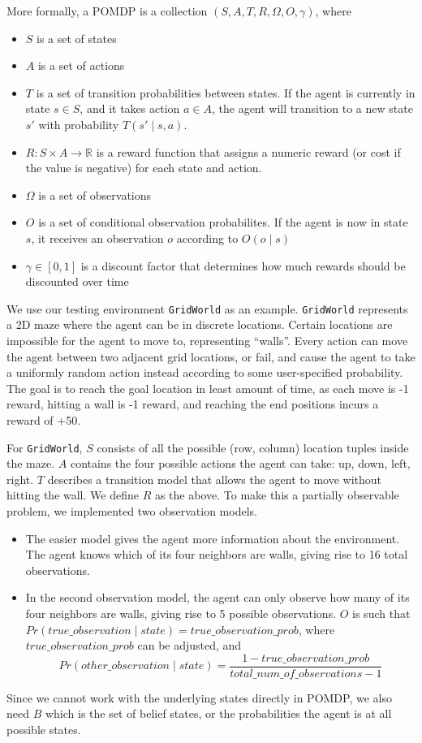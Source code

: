 \documentclass{pset}
\begin{document}
More formally, a POMDP is a collection $(S,A,T,R,\Omega,O,\gamma)$, where

\begin{itemize}
\item $S$ is a set of states
\item $A$ is a set of actions
\item $T$ is a set of transition probabilities between states. If the agent is currently in state $s
\in S$, and it takes action $a \in A$, the agent will transition to a new state
$s'$ with probability
$T(s' \mid s,a)$.
\item $R: S \times A \rightarrow \mathbb{R}$ is a reward function that assigns a numeric reward (or
cost if the value is negative) for each state and action.
\item $\Omega$ is a set of observations
\item $O$ is a set of conditional observation probabilites. If the agent is now in state $s$,
it receives an observation $o$ according to $O(o \mid s)$
\item $\gamma \in [0,1]$ is a discount factor that determines how much rewards should be discounted over time
\end{itemize}

We use our testing environment \texttt{GridWorld} as an example.
\texttt{GridWorld} represents a 2D maze where the agent can be in discrete locations.
Certain locations are impossible for the agent to move to, representing ``walls''. Every
action can move the agent between two adjacent grid locations, or fail, and
cause
the agent to take a uniformly random action instead according to some
user-specified probability. The goal is to reach
the goal location in least amount of time, as each move is -1 reward, hitting a
wall is -1 reward, and reaching the end positions incurs a reward of +50.

For \texttt{GridWorld}, $S$ consists of all the possible (row, column) location
tuples inside the maze.  $A$ contains the four possible actions the agent can
take: up, down, left, right.  $T$ describes a transition model that allows the
agent to move without hitting the wall.  We define $R$ as the above. To make
this a partially observable problem, we implemented two observation models.
\begin{itemize}
\item
The
easier model gives the agent more information about the environment. The agent
knows which of its four neighbors are walls, giving rise to 16 total
observations.
\item
In the second observation model, the agent can only observe how
many of its four neighbors are walls, giving rise to 5 possible observations.
$O$ is such that $Pr(true\_observation\mid state)=true\_observation\_prob$,
where $true\_observation\_prob$ can be adjusted, and
\begin{equation}
Pr(other\_observation\mid
state)=\frac{1-true\_observation\_prob}{total\_num\_of\_observations-1}
\end{equation}
\end{itemize}
Since
we cannot work with the underlying states directly in POMDP, we also need $B$
which is the set of belief states, or the probabilities the agent is at all
possible states.
\end{document}

